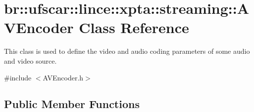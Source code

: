 \hypertarget{classbr_1_1ufscar_1_1lince_1_1xpta_1_1streaming_1_1AVEncoder}{
\section{br::ufscar::lince::xpta::streaming::AVEncoder Class Reference}
\label{classbr_1_1ufscar_1_1lince_1_1xpta_1_1streaming_1_1AVEncoder}
}


This class is used to define the video and audio coding parameters of some audio and video source.  




{\ttfamily \#include $<$AVEncoder.h$>$}

\subsection*{Public Member Functions}
